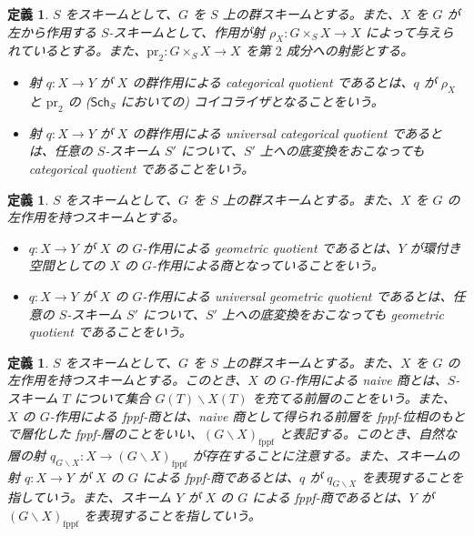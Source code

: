 \documentclass{jsarticle}
\newcommand{\lquot}{\backslash}
\newcommand{\fppflquot}[2]{(#1 \lquot#2)_\mathrm{fppf}}
\newcommand{\FLQ}[2]{\fppflquot{#1}{#2}}
\newcommand{\Sch}[1]{\mathsf{Sch}_{#1}}
\newtheorem{defn}[thm]{定義}
\begin{document}
\begin{defn}
	$S$ をスキームとして、$G$ を $S$ 上の群スキームとする。また、$X$ を $G$ が左から作用する $S$-スキームとして、作用が射 $\rho_X \colon G \times_S X \to X$ によって与えられているとする。また、$\mathrm{pr}_2 \colon G \times_S X \to X$ を第 $2$ 成分への射影とする。
	\begin{itemize}
		\item 射 $q \colon X \to Y$ が $X$ の群作用による categorical quotient であるとは、$q$ が $\rho_X$ と $\mathrm{pr}_2$ の ($\Sch{S}$ においての) コイコライザとなることをいう。
		\item 射 $q \colon X \to Y$ が $X$ の群作用による universal categorical quotient であるとは、任意の $S$-スキーム $S'$ について、$S'$ 上への底変換をおこなっても categorical quotient であることをいう。
	\end{itemize}
\end{defn}

\begin{defn}
	$S$ をスキームとして、$G$ を $S$ 上の群スキームとする。また、$X$ を $G$ の左作用を持つスキームとする。
	\begin{itemize}
		\item $q \colon X \to Y$ が $X$ の $G$-作用による geometric quotient であるとは、$Y$ が環付き空間としての $X$ の $G$-作用による商となっていることをいう。
		\item $q \colon X \to Y$ が $X$ の $G$-作用による universal geometric quotient であるとは、任意の $S$-スキーム $S'$ について、$S'$ 上への底変換をおこなっても geometric quotient であることをいう。
	\end{itemize}
\end{defn}

\begin{defn}
	$S$ をスキームとして、$G$ を $S$ 上の群スキームとする。また、$X$ を $G$ の左作用を持つスキームとする。このとき、$X$ の $G$-作用による naive 商とは、$S$-スキーム $T$ について集合 $G(T)\lquot X(T)$ を充てる前層のことをいう。また、$X$ の $G$-作用による fppf-商とは、naive 商として得られる前層を fppf-位相のもとで層化した fppf-層のことをいい、$\FLQ{G}{X}$ と表記する。このとき、自然な層の射 $q_{G \lquot X} \colon X \to \FLQ{G}{X}$ が存在することに注意する。また、スキームの射 $q \colon X \to Y$ が $X$ の $G$ による fppf-商であるとは、$q$ が $q_{G \lquot X}$ を表現することを指していう。また、スキーム $Y$ が $X$ の $G$ による fppf-商であるとは、$Y$ が $\FLQ{G}{X}$ を表現することを指していう。
\end{defn}
\end{document}
